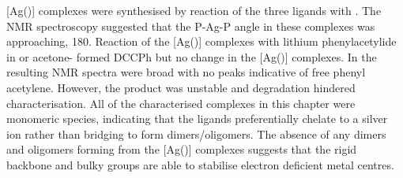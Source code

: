 [Ag(\tBuxantphos)] complexes were synthesised by reaction of the three \tBuxantphos{} ligands with .  The NMR spectroscopy suggested that the P-Ag-P angle in these complexes was approaching, 180\degrees{}.  Reaction of the [Ag(\tBuxantphos)] complexes with lithium phenylacetylide in  or acetone- formed DCCPh but no change in the [Ag(\tBuxantphos)] complexes.  In  the resulting NMR spectra were broad with no peaks indicative of free phenyl acetylene.  However, the product was unstable and degradation hindered characterisation.  All of the characterised complexes in this chapter were monomeric species, indicating that the \tBuxantphos{} ligands preferentially chelate to a silver ion rather than bridging to form dimers/oligomers.  The absence of any dimers and oligomers forming from the [Ag(\tBuxantphos)] complexes suggests that the rigid backbone and bulky \tBu{} groups are able to stabilise electron deficient metal centres.  

 





